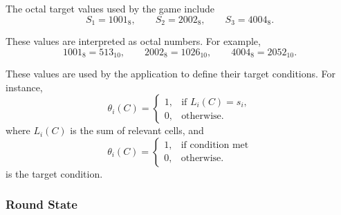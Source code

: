 \documentclass[12pt]{article}
\begin{document}
The octal target values used by the game include
\[
    S_1 = 1001_8,\qquad
    S_2 = 2002_8,\qquad
    S_3 = 4004_8.
\]

These values are interpreted as octal numbers. For example,
\[
    1001_8 = 513_{10},\qquad
    2002_8 = 1026_{10},\qquad
    4004_8 = 2052_{10}.
\]

These values are used by the application to define their target conditions. For instance,
\[
    \theta_i(C) =
    \begin{cases}
        1, & \text{if } L_i(C) = s_i,\\
        0, & \text{otherwise}.
    \end{cases}
\]
where \(L_i(C)\) is the sum of relevant cells, and 
\[
    \theta_i(C) = 
    \begin{cases}
        1, & \text{if condition met}\\
        0, & \text{otherwise}.
    \end{cases}
\] 
is the target condition.

\subsubsection{Round State}
\end{document}
